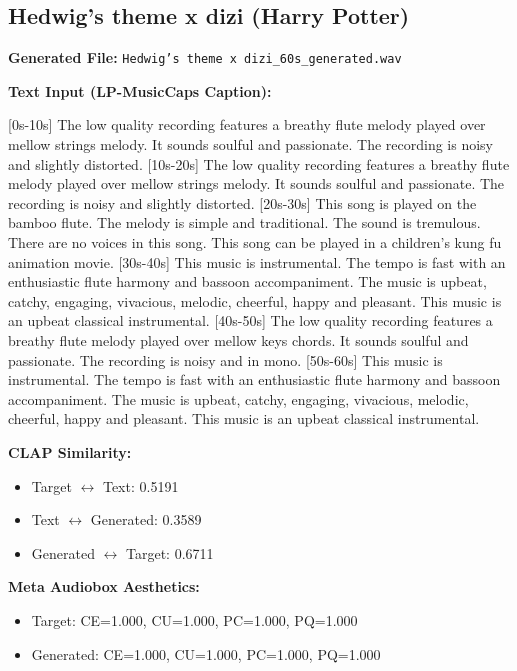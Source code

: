 \documentclass{article}
\begin{document}
\subsection{Hedwig's theme x dizi (Harry Potter)}

\textbf{Generated File:} \texttt{Hedwig's theme x dizi\_60s\_generated.wav}

\textbf{Text Input (LP-MusicCaps Caption):}

\small
[0s-10s] The low quality recording features a breathy flute melody played over mellow strings melody. It sounds soulful and passionate. The recording is noisy and slightly distorted. [10s-20s] The low quality recording features a breathy flute melody played over mellow strings melody. It sounds soulful and passionate. The recording is noisy and slightly distorted. [20s-30s] This song is played on the bamboo flute. The melody is simple and traditional. The sound is tremulous. There are no voices in this song. This song can be played in a children's kung fu animation movie. [30s-40s] This music is instrumental. The tempo is fast with an enthusiastic flute harmony and bassoon accompaniment. The music is upbeat, catchy, engaging, vivacious, melodic, cheerful, happy and pleasant. This music is an upbeat classical instrumental. [40s-50s] The low quality recording features a breathy flute melody played over mellow keys chords. It sounds soulful and passionate. The recording is noisy and in mono. [50s-60s] This music is instrumental. The tempo is fast with an enthusiastic flute harmony and bassoon accompaniment. The music is upbeat, catchy, engaging, vivacious, melodic, cheerful, happy and pleasant. This music is an upbeat classical instrumental.
\normalsize

\textbf{CLAP Similarity:}
\begin{itemize}
    \item Target $\leftrightarrow$ Text: 0.5191
    \item Text $\leftrightarrow$ Generated: 0.3589
    \item Generated $\leftrightarrow$ Target: 0.6711
\end{itemize}

\textbf{Meta Audiobox Aesthetics:}
\begin{itemize}
    \item Target: CE=1.000, CU=1.000, PC=1.000, PQ=1.000
    \item Generated: CE=1.000, CU=1.000, PC=1.000, PQ=1.000
\end{itemize}
\end{document}
